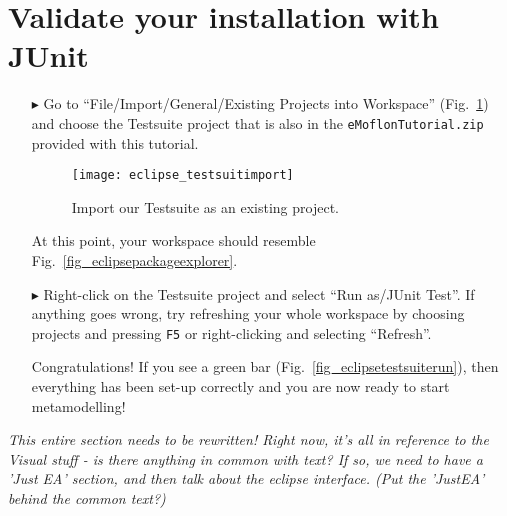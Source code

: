 \pagebreak
\genHeader

\section{Validate your installation with JUnit}
\label{sec:junit}

\begin{enumerate}
\item[$\blacktriangleright$] Go to ``File/Import/General/Existing Projects into Workspace'' (Fig.~\ref{fig_eclipseTestsuiteImport}) and choose the Testsuite project that is also in the \texttt{eMoflonTutorial.zip} provided with this tutorial. 

\begin{figure}[htbp]
	\centering
  \texttt{[image: eclipse\_testsuitimport]}
	\caption{Import our Testsuite as an existing project.}
	\label{fig_eclipseTestsuiteImport}
\end{figure} 


\item[] At this point, your workspace should resemble Fig.~\ref{fig_eclipsepackageexplorer}.


\item[$\blacktriangleright$] Right-click on the Testsuite project and select ``Run as/JUnit Test''.
If anything goes wrong, try refreshing your whole workspace by choosing projects and pressing \texttt{F5} or right-clicking and selecting ``Refresh''.


Congratulations!  If you see a green bar  (Fig.~\ref{fig_eclipsetestsuiterun}), then everything has been set-up correctly and you are now ready to start metamodelling!

\end{enumerate}

\newpage
\mbox{}
\newpage


\emph{This entire section needs to be rewritten! Right now, it's all in reference to the Visual stuff - is there anything in common with text? If so, we need to have a
'Just EA' section, and then talk about the eclipse interface. (Put the 'JustEA' behind the common text?)}

